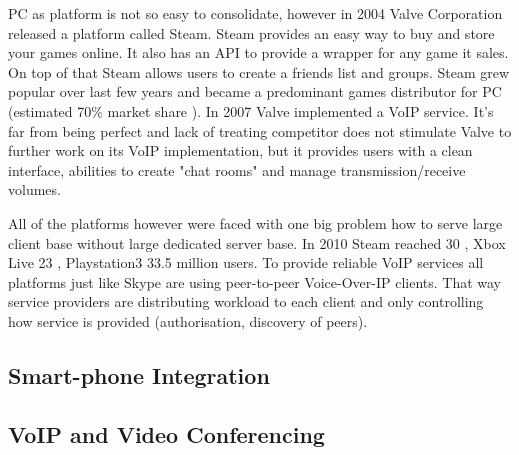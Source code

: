 PC as platform is not so easy to consolidate, however in 2004 Valve Corporation released a platform called Steam. Steam provides an easy way to buy and store your games online. It also has an API to provide a wrapper for any game it sales. On top of that Steam allows users to create a friends list and groups. Steam grew popular over last few years and became a predominant games distributor for PC (estimated 70\% market share \cite{steam_market_share}). In 2007 Valve implemented a VoIP service. It's far from being perfect and lack of treating competitor does not stimulate Valve to further work on its VoIP implementation, but it provides users with a clean interface, abilities to create "chat rooms" and manage transmission/receive volumes.

All of the platforms however were faced with one big problem how to serve large client base without large dedicated server base. In 2010 Steam reached 30  \cite{website:steam_growth}, Xbox Live 23  \cite{xbox_live_market}, Playstation3 33.5 \cite{website:ps3_marketshare} million users. To provide reliable VoIP services all platforms just like Skype are using peer-to-peer Voice-Over-IP clients. That way service providers are distributing workload to each client and only controlling how service is provided (authorisation, discovery of peers).

\subsection{Smart-phone Integration}

\subsection{VoIP and Video Conferencing}

